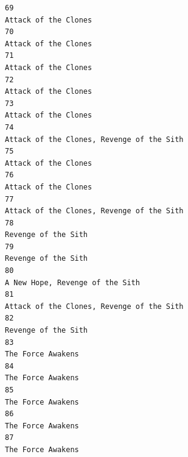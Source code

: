 \documentclass[
]{article}
\begin{document}
\begin{verbatim}
69                                                                                                                      Attack of the Clones
70                                                                                                                      Attack of the Clones
71                                                                                                                      Attack of the Clones
72                                                                                                                      Attack of the Clones
73                                                                                                                      Attack of the Clones
74                                                                                                 Attack of the Clones, Revenge of the Sith
75                                                                                                                      Attack of the Clones
76                                                                                                                      Attack of the Clones
77                                                                                                 Attack of the Clones, Revenge of the Sith
78                                                                                                                       Revenge of the Sith
79                                                                                                                       Revenge of the Sith
80                                                                                                           A New Hope, Revenge of the Sith
81                                                                                                 Attack of the Clones, Revenge of the Sith
82                                                                                                                       Revenge of the Sith
83                                                                                                                         The Force Awakens
84                                                                                                                         The Force Awakens
85                                                                                                                         The Force Awakens
86                                                                                                                         The Force Awakens
87                                                                                                                         The Force Awakens

\end{verbatim}
\end{document}
